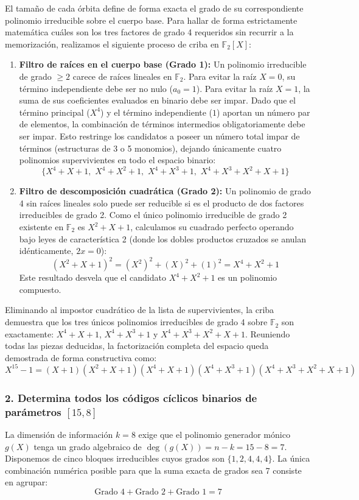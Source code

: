 \documentclass{article}
\begin{document}
El tamaño de cada órbita define de forma exacta el grado de su correspondiente polinomio irreducible sobre el cuerpo base. Para hallar de forma estrictamente matemática cuáles son los tres factores de grado 4 requeridos sin recurrir a la memorización, realizamos el siguiente proceso de criba en $\mathbb{F}_2[X]$:
\begin{enumerate}
    \item \textbf{Filtro de raíces en el cuerpo base (Grado 1):} Un polinomio irreducible de grado $\ge 2$ carece de raíces lineales en $\mathbb{F}_2$. Para evitar la raíz $X=0$, su término independiente debe ser no nulo ($a_0 = 1$). Para evitar la raíz $X=1$, la suma de sus coeficientes evaluados en binario debe ser impar. Dado que el término principal ($X^4$) y el término independiente ($1$) aportan un número par de elementos, la combinación de términos intermedios obligatoriamente debe ser impar. Esto restringe los candidatos a poseer un número total impar de términos (estructuras de 3 o 5 monomios), dejando únicamente cuatro polinomios supervivientes en todo el espacio binario:
    \[ \{X^4+X+1, \,\, X^4+X^2+1, \,\, X^4+X^3+1, \,\, X^4+X^3+X^2+X+1\} \]
    \item \textbf{Filtro de descomposición cuadrática (Grado 2):} Un polinomio de grado 4 sin raíces lineales solo puede ser reducible si es el producto de dos factores irreducibles de grado 2. Como el único polinomio irreducible de grado 2 existente en $\mathbb{F}_2$ es $X^2+X+1$, calculamos su cuadrado perfecto operando bajo leyes de característica 2 (donde los dobles productos cruzados se anulan idénticamente, $2x = 0$):
    \[ (X^2 + X + 1)^2 = (X^2)^2 + (X)^2 + (1)^2 = X^4 + X^2 + 1 \]
    Este resultado desvela que el candidato $X^4+X^2+1$ es un polinomio compuesto.
\end{enumerate}

Eliminando al impostor cuadrático de la lista de supervivientes, la criba demuestra que los tres únicos polinomios irreducibles de grado 4 sobre $\mathbb{F}_2$ son exactamente: $X^4+X+1$, $X^4+X^3+1$ y $X^4+X^3+X^2+X+1$. Reuniendo todas las piezas deducidas, la factorización completa del espacio queda demostrada de forma constructiva como:
\[
X^{15} - 1 = (X + 1)(X^2 + X + 1)(X^4 + X + 1)(X^4 + X^3 + 1)(X^4 + X^3 + X^2 + X + 1)
\]

\subsubsection{2. Determina todos los códigos cíclicos binarios de parámetros \texorpdfstring{$[15, 8]$}{[15, 8]}}
La dimensión de información $k=8$ exige que el polinomio generador mónico $g(X)$ tenga un grado algebraico de $\operatorname{deg}(g(X)) = n - k = 15 - 8 = 7$. Disponemos de cinco bloques irreducibles cuyos grados son $\{1, 2, 4, 4, 4\}$. La única combinación numérica posible para que la suma exacta de grados sea 7 consiste en agrupar:
\[ \text{Grado 4} + \text{Grado 2} + \text{Grado 1} = 7 \]
\end{document}
